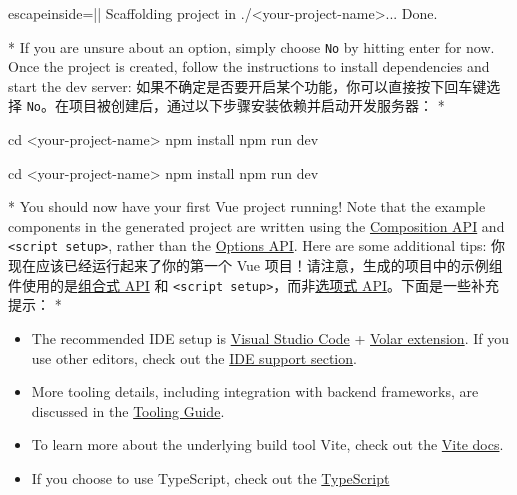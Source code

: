 \begin{paracol}{2}
\begin{codeConsole*}{escapeinside=||}
Scaffolding project in ./<your-project-name>...
Done.
\end{codeConsole*} 
\switchcolumn[0]*%
If you are unsure about an option, simply choose \texttt{No} by hitting
enter for now. Once the project is created, follow the instructions to
install dependencies and start the dev server:
\switchcolumn
如果不确定是否要开启某个功能，你可以直接按下回车键选择
\texttt{No}。在项目被创建后，通过以下步骤安装依赖并启动开发服务器：
\switchcolumn[0]*%
\begin{codeShellMul}
cd <your-project-name>
npm install
npm run dev
\end{codeShellMul}
\switchcolumn
\begin{codeShellMul}
cd <your-project-name>
npm install
npm run dev
\end{codeShellMul}
\switchcolumn[0]*%
You should now have your first Vue project running! Note that the
example components in the generated project are written using the
\href{https://vuejs.org/guide/introduction.html\#composition-api}{Composition
API} and \texttt{\textless{}script\ setup\textgreater{}}, rather than
the
\href{https://vuejs.org/guide/introduction.html\#options-api}{Options
API}. Here are some additional tips:
\switchcolumn
你现在应该已经运行起来了你的第一个 Vue
项目！请注意，生成的项目中的示例组件使用的是\href{https://cn.vuejs.org/guide/introduction.html\#composition-api}{组合式
API} 和
\texttt{\textless{}script\ setup\textgreater{}}，而非\href{https://cn.vuejs.org/guide/introduction.html\#options-api}{选项式
API}。下面是一些补充提示：
\switchcolumn[0]*%
\begin{itemize}
    \item
      The recommended IDE setup is
      \href{https://code.visualstudio.com/}{Visual Studio Code} +
      \href{https://marketplace.visualstudio.com/items?itemName=Vue.volar}{Volar
      extension}. If you use other editors, check out the
      \href{https://vuejs.org/guide/scaling-up/tooling.html\#ide-support}{IDE
      support section}.
    \item
      More tooling details, including integration with backend frameworks,
      are discussed in the
      \href{https://vuejs.org/guide/scaling-up/tooling.html}{Tooling Guide}.
    \item
      To learn more about the underlying build tool Vite, check out the
      \href{https://vitejs.dev/}{Vite docs}.
    \item
      If you choose to use TypeScript, check out the
      \href{https://vuejs.org/guide/typescript/overview.html}{TypeScript
}
\end{itemize}
\end{paracol}
